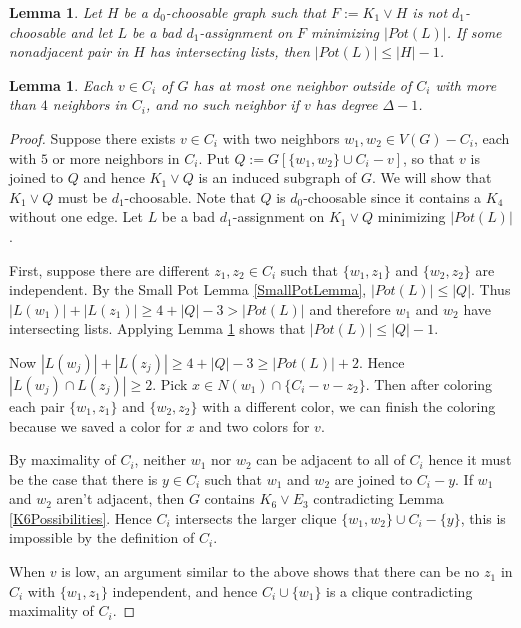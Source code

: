 \documentclass[12pt]{article}
\newtheorem{lemma}[theorem]{Lemma}
\theoremstyle{definition}
\begin{document}
\begin{lemma}\cite{CR12}\label{NeighborhoodPotShrink}
Let $H$ be a $d_0$-choosable graph such that $F := {K_1}\vee{H}$ is not
$d_1$-choosable and let $L$ be a bad $d_1$-assignment on $F$ minimizing $|Pot(L)|$.  If some
nonadjacent pair in $H$ has intersecting lists, then $|Pot(L)| \leq |H| - 1$.
\end{lemma}

\begin{lemma}\label{4neighbors}
Each $v \in C_i$ of $G$ has at most one
neighbor outside of $C_i$ with more than $4$ neighbors in $C_i$, and no such
neighbor if $v$ has degree $\Delta-1$.
\end{lemma}
\begin{proof}
Suppose there exists $v \in C_i$ with two neighbors $w_1, w_2 \in V(G)- C_i$, each with $5$ or more neighbors in $C_i$.  
Put $Q :=G[\{w_1,w_2\} \cup C_i - v]$, so that $v$ is joined to $Q$ and hence ${K_1}\vee{Q}$ is an induced subgraph of $G$.  We will show that ${K_1}\vee{Q}$ must be $d_1$-choosable.  Note that $Q$ is $d_0$-choosable since it contains a $K_4$ without one edge. Let $L$ be a bad $d_1$-assignment on ${K_1}\vee{Q}$ minimizing $|Pot(L)|$.

First, suppose there are different $z_1,z_2 \in C_i$ such that $\{w_1, z_1\}$
and $\{w_2, z_2\}$ are independent.  By the Small Pot Lemma \ref{SmallPotLemma}, $|Pot(L)| \leq |Q|$. Thus $|L(w_1)| +|L(z_1)| \geq 4 + |Q| - 3 > |Pot(L)|$ and therefore $w_1$ and $w_2$ have intersecting lists.  Applying Lemma \ref{NeighborhoodPotShrink} shows that $|Pot(L)| \leq |Q| - 1$.

Now $|L(w_j)| + |L(z_j)| \geq 4 + |Q| - 3 \geq |Pot(L)| + 2$.  Hence $|L(w_j) \cap L(z_j)| \geq 2$.  Pick $x \in N(w_1) \cap \{C_i - v - z_2\}$.  Then after coloring each pair $\{w_1, z_1\}$ and $\{w_2, z_2\}$ with a different color, we can finish the coloring because we saved a color for $x$ and two colors for $v$.

By maximality of $C_i$, neither $w_1$ nor $w_2$ can be adjacent to all of $C_i$
hence it must be the case that there is $y \in C_i$ such that $w_1$ and $w_2$
are joined to $C_i - y$.  If $w_1$ and $w_2$ aren't adjacent, then $G$ contains ${K_6}\vee{E_3}$ contradicting Lemma \ref{K6Possibilities}.  Hence $C_i$ intersects the larger clique $\{w_1, w_2\} \cup C_i - \{y\}$, this is impossible by the definition of $C_i$.

When $v$ is low, an argument similar to the above shows that there can be no
$z_1$ in $C_i$ with $\{w_1, z_1\}$ independent, and hence $C_i \cup
\{w_1\}$ is a clique contradicting maximality of $C_i$.
\end{proof}
\end{document}
